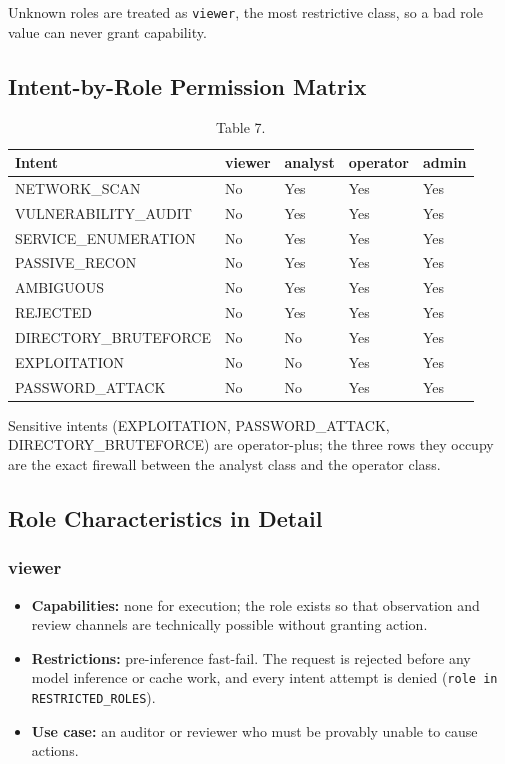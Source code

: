 \documentclass[10pt,journal,onecolumn]{IEEEtran}
\begin{document}
Unknown roles are treated as \texttt{viewer}, the most restrictive class, so a bad role value can never grant capability.

\subsection{Intent-by-Role Permission Matrix}

\begin{table}[h]
\caption{Table 7.}
\label{tab:t7}
\begin{tabularx}{\columnwidth}{l >{\raggedright\arraybackslash}X >{\raggedright\arraybackslash}X >{\raggedright\arraybackslash}X >{\raggedright\arraybackslash}X}
\toprule
\textbf{Intent} & \textbf{viewer} & \textbf{analyst} & \textbf{operator} & \textbf{admin}\\
\midrule
NETWORK\_SCAN & No & Yes & Yes & Yes\\
VULNERABILITY\_AUDIT & No & Yes & Yes & Yes\\
SERVICE\_ENUMERATION & No & Yes & Yes & Yes\\
PASSIVE\_RECON & No & Yes & Yes & Yes\\
AMBIGUOUS & No & Yes & Yes & Yes\\
REJECTED & No & Yes & Yes & Yes\\
DIRECTORY\_BRUTEFORCE & No & No & Yes & Yes\\
EXPLOITATION & No & No & Yes & Yes\\
PASSWORD\_ATTACK & No & No & Yes & Yes\\
\bottomrule
\end{tabularx}
\end{table}

Sensitive intents (EXPLOITATION, PASSWORD\_ATTACK, DIRECTORY\_BRUTEFORCE) are operator-plus; the three rows they occupy are the exact firewall between the analyst class and the operator class.

\subsection{Role Characteristics in Detail}

\subsubsection{viewer}

\begin{itemize}
\item \textbf{Capabilities:} none for execution; the role exists so that observation and review channels are technically possible without granting action.
\item \textbf{Restrictions:} pre-inference fast-fail. The request is rejected before any model inference or cache work, and every intent attempt is denied (\texttt{role in RESTRICTED\_\allowbreak ROLES}).
\item \textbf{Use case:} an auditor or reviewer who must be provably unable to cause actions.
\end{itemize}
\end{document}
